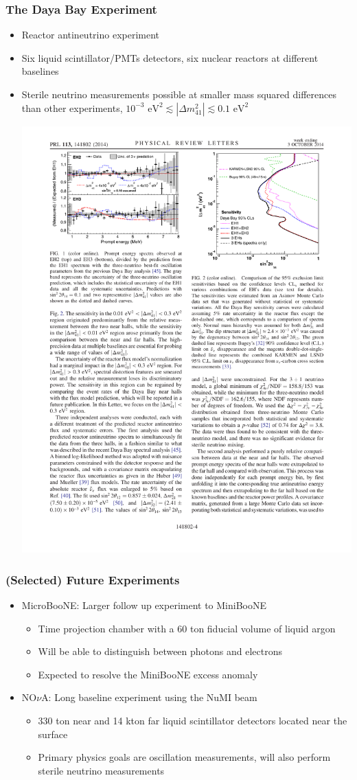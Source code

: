 \documentclass[mathserif,18pt,xcolor=table]{beamer}
\begin{document}
\begin{frame}
  \frametitle{The Daya Bay Experiment}
  \begin{itemize}
  \item Reactor antineutrino experiment
  \item Six liquid scintillator/PMTs detectors, six nuclear reactors at different baselines
  \item Sterile neutrino measurements possible at smaller mass squared differences than other experiments, $10^{−3} \text{ eV}^2  \lesssim \left|\Delta m^{2}_{41}\right| \lesssim 0.1 \text{ eV}^2$
    \begin{center}
      \includegraphics[width=.5\linewidth]{../figures/daya1.pdf}
    \end{center}
  \end{itemize}
\end{frame}

\begin{frame}
  \frametitle{(Selected) Future Experiments}
  \begin{itemize}
  \item MicroBooNE: Larger follow up experiment to MiniBooNE
   \begin{itemize}
     \item Time projection chamber with a 60 ton fiducial volume of liquid argon
     \item Will be able to distinguish between photons and electrons
     \item Expected to resolve the MiniBooNE excess anomaly
   \end{itemize}
  \item NO$\nu$A: Long baseline experiment using the NuMI beam
   \begin{itemize}
     \item 330 ton near and 14 kton far liquid scintillator detectors located near the surface
     \item Primary physics goals are oscillation measurements, will also perform sterile neutrino measurements
   \end{itemize}
  \end{itemize}
\end{frame}
\end{document}
